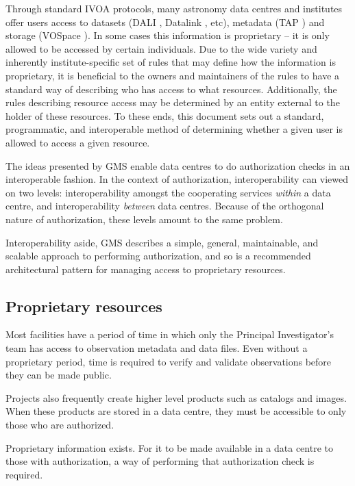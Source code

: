 \documentclass[11pt,a4paper]{ivoa}
\begin{document}
Through standard IVOA protocols, many astronomy data centres and institutes offer users access to datasets (DALI \citep{std:DALI}, Datalink \citep{std:Datalink}, etc), metadata (TAP \citep{std:TAP}) and storage (VOSpace \citep{std:VOSpace}).  In some cases this information is proprietary -- it is only allowed to be accessed by certain individuals.  Due to the wide variety and inherently institute-specific set of rules that may define how the information is proprietary, it is beneficial to the owners and maintainers of the rules to have a standard way of describing who has access to what resources.  Additionally, the rules describing resource access may be determined by an entity external to the holder of these resources.  To these ends, this document sets out a standard, programmatic, and interoperable method of determining whether a given user is allowed to access a given resource.

The ideas presented by GMS enable data centres to do authorization checks in an interoperable fashion.  In the context of authorization, interoperability can viewed on two levels:  interoperability amongst the cooperating services \emph{within} a data centre, and interoperability \emph{between} data centres.  Because of the orthogonal nature of authorization, these levels amount to the same problem.

Interoperability aside, GMS describes a simple, general, maintainable, and scalable approach to performing authorization, and so is a recommended architectural pattern for managing access to proprietary resources.

\subsection{Proprietary resources}

Most facilities have a period of time in which only the Principal Investigator's team has access to observation metadata and data files.  Even without a proprietary period, time is required to verify and validate observations before they can be made public.

Projects also frequently create higher level products such as catalogs and images.  When these products are stored in a data centre, they must be accessible to only those who are authorized.

Proprietary information exists.  For it to be made available in a data centre to those with authorization, a way of performing that authorization check is required.
\end{document}
